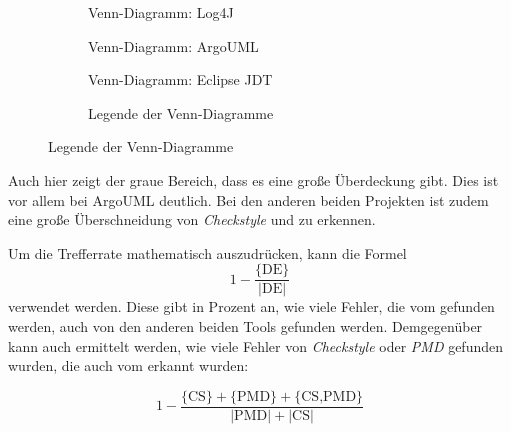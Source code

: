 \begin{figure}[ht!]

   \begin{subfigure}[b]{0.4\textwidth}
    \centering

    \caption{Venn-Diagramm: Log4J}
    \label{fig:log4j_venn}
\end{subfigure}
\hfill
\begin{subfigure}[b]{0.4\textwidth}
    \centering

    \caption{Venn-Diagramm: ArgoUML}
    \label{fig:argo_venn}
\end{subfigure}
\hspace{10cm}
\begin{subfigure}[b]{0.4\textwidth}
    \centering

    \caption{Venn-Diagramm: Eclipse \ac{JDT}}
    \label{fig:eclipse_venn}
\end{subfigure}
\hspace{3.4cm}
\begin{subfigure}[b]{0.25\textwidth}
    \centering

\vspace{0.3cm}
    \caption{Legende der Venn-Diagramme}
    \label{fig:legend_venn}
\end{subfigure}
\end{figure}

Auch hier zeigt der graue Bereich, dass es eine große Überdeckung gibt. Dies ist vor allem bei ArgoUML deutlich. Bei den anderen beiden Projekten ist zudem eine große Überschneidung von \textit{Checkstyle} und \doceval zu erkennen.

Um die Trefferrate mathematisch auszudrücken, kann die Formel
\begin{equation}\label{eq1}
    1-\frac{\text{\{DE\}}}{|\text{DE}|}
\end{equation} verwendet werden. Diese gibt in Prozent an, wie viele Fehler, die vom \doceval gefunden werden, auch von den anderen beiden Tools gefunden werden. Demgegenüber kann auch ermittelt werden, wie viele Fehler von \textit{Checkstyle} oder \textit{PMD} gefunden wurden, die auch vom \doceval erkannt wurden:

\begin{equation}\label{eq2}
    1-\frac{\text{\{CS\}}+\text{\{PMD\}}+\text{\{CS,PMD\}}}{|\text{PMD}|+|\text{CS}|}
\end{equation}

